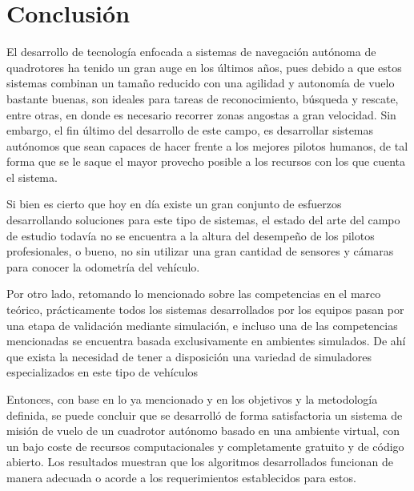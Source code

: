 \chapter{Conclusión}

El desarrollo de tecnología enfocada a sistemas de navegación autónoma de quadrotores ha tenido un gran auge en los últimos años, pues debido a que estos sistemas combinan un tamaño reducido con una agilidad y autonomía de vuelo bastante buenas, son ideales para tareas de reconocimiento, búsqueda y rescate, entre otras, en donde es necesario recorrer zonas angostas a gran velocidad. Sin embargo, el fin último del desarrollo de este campo, es desarrollar sistemas autónomos que sean capaces de hacer frente a los mejores pilotos humanos, de tal forma que se le saque el mayor provecho posible a los recursos con los que cuenta el sistema.

Si bien es cierto que hoy en día existe un gran conjunto de esfuerzos desarrollando soluciones para este tipo de sistemas, el estado del arte del campo de estudio todavía no se encuentra a la altura del desempeño de los pilotos profesionales, o bueno, no sin utilizar una gran cantidad de sensores y cámaras para conocer la odometría del vehículo.  

Por otro lado, retomando lo mencionado sobre las competencias en el marco teórico, prácticamente todos los sistemas desarrollados por los equipos pasan por una etapa de validación mediante simulación, e incluso una de las competencias mencionadas se encuentra basada exclusivamente en ambientes simulados. De ahí que exista la necesidad de tener a disposición una variedad de simuladores especializados en este tipo de vehículos

Entonces, con base en lo ya mencionado y en los objetivos y la metodología definida, se puede concluir que se desarrolló de forma satisfactoria un sistema de misión de vuelo de un cuadrotor autónomo basado en una ambiente virtual, con un bajo coste de recursos computacionales y  completamente gratuito y de código abierto. Los resultados muestran que los algoritmos desarrollados funcionan de manera adecuada o acorde a los requerimientos establecidos para estos.

